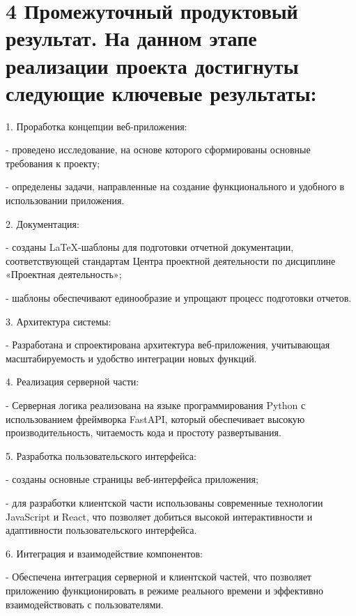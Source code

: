 \documentclass[a4paper,12pt]{article}
\begin{document}
\section{4 Промежуточный продуктовый результат. На данном этапе реализации проекта достигнуты следующие ключевые результаты:}
\begin{description}
    \item 1.	Проработка концепции веб-приложения:
    \item - проведено исследование, на основе которого сформированы основные требования к проекту;
    \item - определены задачи, направленные на создание функционального и удобного в использовании приложения.


    \item 2.	Документация:

    \item - созданы LaTeX-шаблоны для подготовки отчетной документации, соответствующей стандартам Центра проектной деятельности по дисциплине «Проектная деятельность»;

    \item - шаблоны обеспечивают единообразие и упрощают процесс подготовки отчетов.

    \item 3.	Архитектура системы:
    \item - Разработана и спроектирована архитектура веб-приложения, учитывающая масштабируемость и удобство интеграции новых функций.
    \item 4.	Реализация серверной части:
    \item - Серверная логика реализована на языке программирования Python с использованием фреймворка FastAPI, который обеспечивает высокую производительность, читаемость кода и простоту развертывания.
    \item 5.	Разработка пользовательского интерфейса:
    \item - созданы основные страницы веб-интерфейса приложения;
    \item - для разработки клиентской части использованы современные технологии JavaScript и React, что позволяет добиться высокой интерактивности и адаптивности пользовательского интерфейса.

\newpage
    \item 6.	Интеграция и взаимодействие компонентов:
    \item - Обеспечена интеграция серверной и клиентской частей, что позволяет приложению функционировать в режиме реального времени и эффективно взаимодействовать с пользователями.
\end{description}
\end{document}
